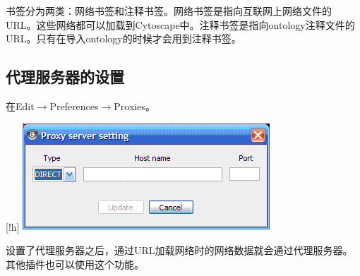书签分为两类：网络书签和注释书签。网络书签是指向互联网上网络文件的URL。这些网络都可以加载到Cytoscape中。注释书签是指向ontology注释文件的URL。只有在导入ontology的时候才会用到注释书签。
 
\subsection{代理服务器的设置}
在Edit$\rightarrow$Preferences$\rightarrow$Proxies。

\begin{center}[!h]
\includegraphics[width=\textwidth]{images/ProxyServerSetting.png} 
\end{center}

设置了代理服务器之后，通过URL加载网络时的网络数据就会通过代理服务器。其他插件也可以使用这个功能。
